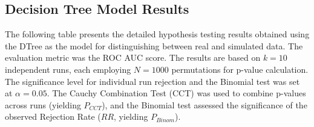\begin{appendices}
  \section{Decision Tree Model Results}
  \label{sec:dt_results_appendix} %

  The following table presents the detailed hypothesis testing results obtained using the DTree as the model for distinguishing between real and simulated data. The evaluation metric was the ROC AUC score. The results are based on $k=10$ independent runs, each employing $N=1000$ permutations for p-value calculation. The significance level for individual run rejection and the Binomial test was set at $\alpha=0.05$. The Cauchy Combination Test (CCT) was used to combine p-values across runs (yielding $P_{CCT}$), and the Binomial test assessed the significance of the observed Rejection Rate ($RR$, yielding $P_{Binom}$).


\end{appendices}
